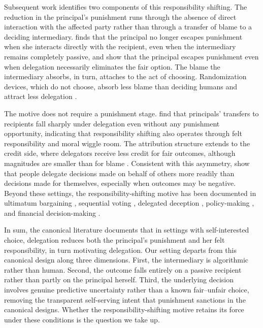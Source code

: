Subsequent work identifies two components of this responsibility shifting. The reduction in the principal's punishment runs through the absence of direct interaction with the affected party rather than through a transfer of blame to a deciding intermediary. \citet{coffman_intermediation_2011} finds that the principal no longer escapes punishment when she interacts directly with the recipient, even when the intermediary remains completely passive, and \citet{oexl_shifting_2013} show that the principal escapes punishment even when delegation necessarily eliminates the fair option. The blame the intermediary absorbs, in turn, attaches to the act of choosing. Randomization devices, which do not choose, absorb less blame than deciding humans and attract less delegation \citep{bartling_shifting_2012, oexl_shifting_2013}.

The motive does not require a punishment stage. \citet{hamman_self-interest_2010} find that principals' transfers to recipients fall sharply under delegation even without any punishment opportunity, indicating that responsibility shifting also operates through felt responsibility and moral wiggle room. The attribution structure extends to the credit side, where delegators receive less credit for fair outcomes, although magnitudes are smaller than for blame \citep{argenton_potters_yang_2023}. Consistent with this asymmetry, \citet{steffel_passing_2016} show that people delegate decisions made on behalf of others more readily than decisions made for themselves, especially when outcomes may be negative. Beyond these settings, the responsibility-shifting motive has been documented in ultimatum bargaining \citep{fershtman_gneezy_2001}, sequential voting \citep{bartling_fischbacher_schudy_2015}, delegated deception \citep{erat_avoiding_2013, gawn_lying_2019, kandul_do_2018}, policy-making \citep{hill_does_2015}, and financial decision-making \citep{freer_friedman_weidenholzer_2024}.

In sum, the canonical literature documents that in settings with self-interested choice, delegation reduces both the principal's punishment and her felt responsibility, in turn motivating delegation. Our setting departs from this canonical design along three dimensions. First, the intermediary is algorithmic rather than human. Second, the outcome falls entirely on a passive recipient rather than partly on the principal herself. Third, the underlying decision involves genuine predictive uncertainty rather than a known fair--unfair choice, removing the transparent self-serving intent that punishment sanctions in the canonical designs. Whether the responsibility-shifting motive retains its force under these conditions is the question we take up.


